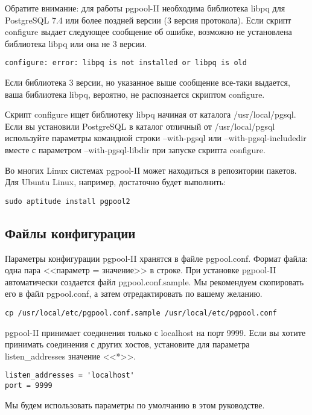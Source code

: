 Обратите внимание: для работы pgpool-II необходима библиотека libpq для PostgreSQL 7.4 или более поздней версии (3 версия протокола).
Если скрипт configure выдает следующее сообщение об ошибке, возможно не установлена библиотека libpq или она не 3 версии.
\begin{lstlisting}[label=lst:pgpool2,caption=Установка pgpool-II]
configure: error: libpq is not installed or libpq is old
\end{lstlisting}

Если библиотека 3 версии, но указанное выше сообщение все-таки выдается, ваша библиотека libpq, вероятно,
не распознается скриптом configure.

Скрипт configure ищет библиотеку libpq начиная от каталога /usr/local/pgsql. Если вы установили PostgreSQL в каталог
отличный от /usr/local/pgsql используйте параметры командной строки --with-pgsql или --with-pgsql-includedir вместе с
параметром --with-pgsql-libdir при запуске скрипта configure.

Во многих Linux системах pgpool-II может находиться в репозитории пакетов.
Для Ubuntu Linux, например, достаточно будет выполнить:
\begin{lstlisting}[label=lst:pgpool3,caption=Установка pgpool-II]
sudo aptitude install pgpool2
\end{lstlisting}

\subsection{Файлы конфигурации}
Параметры конфигурации pgpool-II хранятся в файле pgpool.conf. Формат файла: одна пара <<параметр = значение>> в строке.
При установке pgpool-II автоматически создается файл pgpool.conf.sample. Мы рекомендуем скопировать его в файл pgpool.conf,
а затем отредактировать по вашему желанию.
\begin{lstlisting}[label=lst:pgpool4,caption=Файлы конфигурации]
cp /usr/local/etc/pgpool.conf.sample /usr/local/etc/pgpool.conf
\end{lstlisting}

pgpool-II принимает соединения только с localhost на порт 9999. Если вы хотите принимать соединения с других хостов,
установите для параметра listen\_addresses значение <<*>>.
\begin{lstlisting}[label=lst:pgpool5,caption=Файлы конфигурации]
listen_addresses = 'localhost'
port = 9999
\end{lstlisting}

Мы будем использовать параметры по умолчанию в этом руководстве.

